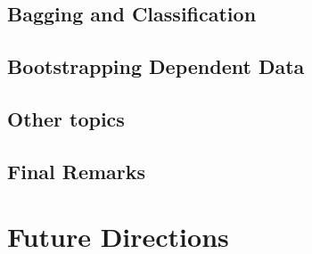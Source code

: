\documentclass[11pt]{article}
\begin{document}
\subsection{Bagging and Classification}
\label{sec-2-8}
\subsection{Bootstrapping Dependent Data}
\label{sec-2-9}
\subsection{Other topics}
\label{sec-2-10}
\subsection{Final Remarks}
\label{sec-2-11}
\section{Future Directions}
\label{sec-3}
\end{document}
